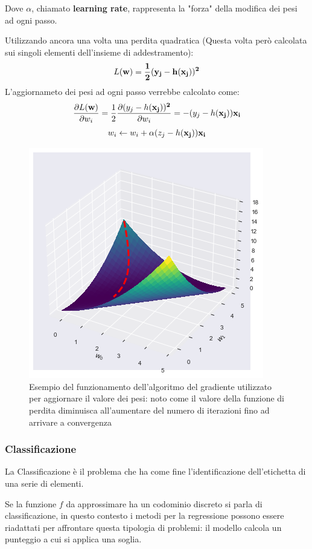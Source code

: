 \documentclass[../../main.tex]{subfiles}
\begin{document}
    Dove $\alpha$, chiamato \textbf{learning rate}, rappresenta la "forza" della modifica dei pesi ad ogni passo.

    Utilizzando ancora una volta una perdita quadratica (Questa volta però calcolata sui singoli elementi dell'insieme di addestramento):
    \[L(\bf{w}) = \frac{1}{2}(y_j - h(\bf{x_j}))^2\]
    L'aggiornameto dei pesi ad ogni passo verrebbe calcolato come:
    \[\frac{\partial L(\bf{w})}{\partial w_i} = \frac{1}{2}\frac{\partial(y_j - h(\bf{x_j}))^2}{\partial w_i} = - (y_j - h(\bf{x_j})) x_i\]
    \[w_i \leftarrow w_i + \alpha (z_j - h(\bf{x_j})) x_i\]
    \begin{figure}[H]
        \centering
        \includegraphics[scale = 0.6]{immagini/4_1/loss_function.png}
        \caption{Esempio del funzionamento dell'algoritmo del gradiente utilizzato per aggiornare il valore dei pesi: noto come il valore della funzione di perdita diminuisca all'aumentare del numero di iterazioni fino ad arrivare a convergenza}
    \end{figure}
   

    \subsubsection{Classificazione} 
    
    \begin{dfn}
        La Classificazione è il problema che ha come fine l'identificazione dell'etichetta di una serie di elementi.
    \end{dfn}

    Se la funzione $f$ da approssimare ha un codominio discreto si parla di classificazione, in questo contesto i metodi per la regressione possono essere riadattati per affrontare questa tipologia di problemi: il modello calcola un punteggio a cui si applica una soglia.
\end{document}
